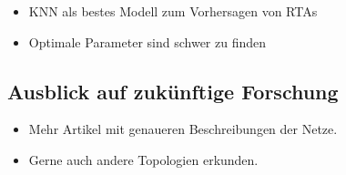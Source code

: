 \documentclass{scrartcl}
\begin{document}
\begin{itemize}
   \item{KNN als bestes Modell zum Vorhersagen von RTAs}
   \item{Optimale Parameter sind schwer zu finden}
\end{itemize}

\subsection{Ausblick auf zukünftige Forschung}

\begin{itemize}
   \item{Mehr Artikel mit genaueren Beschreibungen der Netze.}
   \item{Gerne auch andere Topologien erkunden.}
\end{itemize}

\printbibliography
\listoffigures
\listoftables
\end{document}
